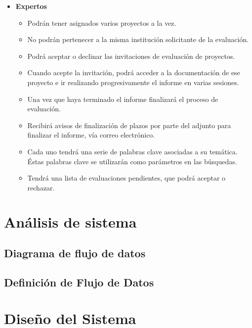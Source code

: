 \documentclass[12pt,a4paper,spanish,twoside]{article}
\begin{document}
\begin{itemize}
\item \textbf{Expertos}
\begin{itemize}
\item Podrán tener asignados varios proyectos a la vez. 
\item No podrán pertenecer a la misma institución solicitante de la evaluación.
\item Podrá aceptar o declinar las invitaciones de evaluación de proyectos.
\item Cuando acepte la invitación, podrá acceder a la documentación de ese proyecto e ir realizando 
progresivamente el informe en varias sesiones.
\item Una vez que haya terminado el informe finalizará el proceso de evaluación.
\item Recibirá avisos de finalización de plazos por parte del adjunto para finalizar el informe, 
vía correo electrónico.
\item Cada uno tendrá una serie de palabras clave asociadas a su temática. Éstas palabras clave se 
utilizarán como parámetros en las búsquedas.
\item Tendrá una lista de evaluaciones pendientes, que podrá aceptar o rechazar.
\end{itemize}

\end{itemize}

\section{Análisis de sistema}
\subsection{Diagrama de flujo de datos}


\subsection{Definición de Flujo de Datos}


\section{Diseño del Sistema}
\end{document}
